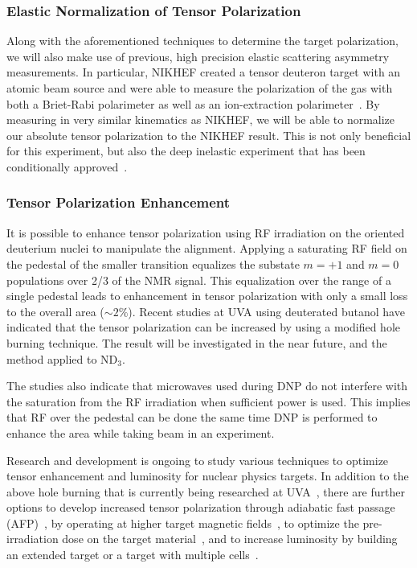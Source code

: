 \subsubsection{Elastic Normalization of Tensor Polarization}

Along with the aforementioned techniques to determine the target polarization, we will also make use of 
previous, high precision elastic scattering asymmetry measurements.  In particular, NIKHEF created a 
tensor deuteron target with an atomic beam source and were able to measure the polarization of the gas 
with both a Briet-Rabi polarimeter as well as an ion-extraction polarimeter~\cite{Zhou:1996gi,Bouwhuis:1998jj}.   
By measuring in very similar kinematics as NIKHEF, we will be able to normalize our absolute tensor polarization
to the NIKHEF result.   This is not only beneficial for this experiment, but also the deep inelastic experiment
that has been conditionally approved~\cite{b1prop}.

\subsubsection{Tensor Polarization Enhancement}
It is possible to enhance tensor polarization using RF irradiation on the oriented deuterium nuclei to manipulate the alignment.
Applying a saturating RF field on the pedestal of the smaller transition equalizes the substate $m=+1$ and $m=0$ populations
over 2/3 of the NMR signal.  This equalization over the range of a single pedestal leads to enhancement in tensor polarization with only a small loss
to the overall area ($\sim 2\%$).  Recent studies at UVA using deuterated butanol have indicated that the tensor polarization can be increased by using a modified hole burning technique. The result will be investigated in the near future, and the method applied to ND$_3$.

The studies also indicate that microwaves used during DNP do not
interfere with the saturation from the RF irradiation when sufficient power is used.  This implies that RF over the pedestal can be done the same time DNP is performed to enhance the area while taking beam in an experiment.  

Research and development is ongoing to study various techniques to optimize tensor enhancement and luminosity for nuclear physics targets. In addition to the above hole burning that is currently being researched at UVA~\cite{keller1, keller2, keller3,Keller:2015tn}, there are further options to develop increased tensor polarization through adiabatic fast passage (AFP)~\cite{PhysRevB.46.6596}, by operating at higher target magnetic fields~\cite{CRABBLAB}, to optimize the pre-irradiation dose on the target material~\cite{Bueltmann:1998wq}, and to increase luminosity by building an extended target or a target with multiple cells~\cite{Rondon-Aramayo:2014ida}.

